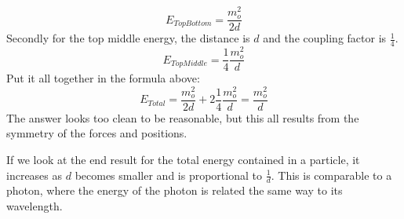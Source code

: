 $$ E_{TopBottom} =  \frac{m_o^2}{2d} $$
Secondly for the top middle energy, the distance is $d$ and the coupling factor is $ \frac{1}{4}$.
$$ E_{TopMiddle} =  \frac{1}{4} \frac{m_o^2}{d} $$
Put it all together in the formula above:
$$ E_{Total}= \frac{m_o^2}{2d} + 2 \frac{1}{4} \frac{m_o^2}{d} = \frac{m_o^2}{d}$$
The answer looks too clean to be reasonable, but this all results from the symmetry of the forces and positions.

If we look at the end result for the total energy contained in a particle, it increases as $d$ becomes smaller and is proportional to $\frac{1}{d}$. This is comparable to a photon, where the energy of the photon is related  the same way to its wavelength.




